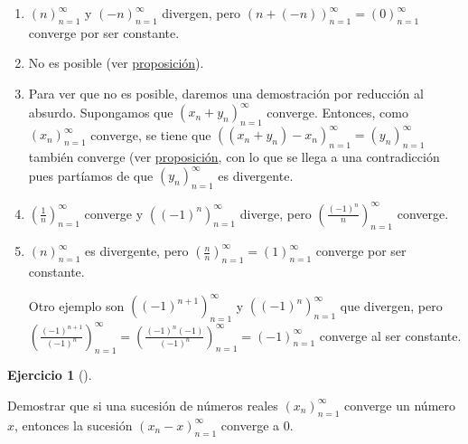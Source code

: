 \documentclass[
  spanish,
  a4paper,
]{scrreport}
\theoremstyle{definition}
\newtheorem{exercise}{Ejercicio}[chapter]
\theoremstyle{remark}
\begin{document}
\begin{tcolorbox}[enhanced jigsaw, arc=.35mm, bottomrule=.15mm, bottomtitle=1mm, breakable, colback=white, colbacktitle=quarto-callout-tip-color!10!white, colframe=quarto-callout-tip-color-frame, coltitle=black, left=2mm, leftrule=.75mm, opacityback=0, opacitybacktitle=0.6, rightrule=.15mm, title=\textcolor{quarto-callout-tip-color}{\faLightbulb}\hspace{0.5em}{Solución}, titlerule=0mm, toprule=.15mm, toptitle=1mm]

\begin{enumerate}
\def\labelenumi{\alph{enumi}.}
\item
  \((n)_{n=1}^\infty\) y \((-n)_{n=1}^\infty\) divergen, pero
  \((n+(-n))_{n=1}^\infty = (0)_{n=1}^\infty\) converge por ser
  constante.
\item
  No es posible (ver
  \href{https://aprendeconalf.es/analisis-manual/sucesiones.html\#prp-algebra-limites-sucesiones}{proposición}).
\item
  Para ver que no es posible, daremos una demostración por reducción al
  absurdo. Supongamos que \((x_n+y_n)_{n=1}^\infty\) converge. Entonces,
  como \((x_n)_{n=1}^\infty\) converge, se tiene que
  \(((x_n+y_n)-x_n)_{n=1}^\infty = (y_n)_{n=1}^\infty\) también converge
  (ver
  \href{https://aprendeconalf.es/analisis-manual/sucesiones.html\#prp-algebra-limites-sucesiones}{proposición},
  con lo que se llega a una contradicción pues partíamos de que
  \((y_n)_{n=1}^\infty\) es divergente.
\item
  \(\left(\frac{1}{n}\right)_{n=1}^\infty\) converge y
  \(((-1)^n)_{n=1}^\infty\) diverge, pero
  \(\left(\frac{(-1)^n}{n}\right)_{n=1}^\infty\) converge.
\item
  \((n)_{n=1}^\infty\) es divergente, pero
  \(\left(\frac{n}{n}\right)_{n=1}^\infty = (1)_{n=1}^\infty\) converge
  por ser constante.

  Otro ejemplo son \(((-1)^{n+1})_{n=1}^\infty\) y
  \(((-1)^n)_{n=1}^\infty\) que divergen, pero
  \((\frac{(-1)^{n+1}}{(-1)^n})_{n=1}^\infty = (\frac{(-1)^n(-1)}{(-1)^n})_{n=1}^\infty = (-1)_{n=1}^\infty\)
  converge al ser constante.
\end{enumerate}

\end{tcolorbox}

\begin{exercise}[]\protect\hypertarget{exr-convergencia-diferencia-limite}{}\label{exr-convergencia-diferencia-limite}

Demostrar que si una sucesión de números reales \((x_n)_{n=1}^\infty\)
converge un número \(x\), entonces la sucesión \((x_n-x)_{n=1}^\infty\)
converge a \(0\).

\end{exercise}
\end{document}
